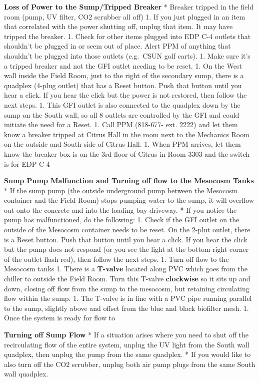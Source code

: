 \documentclass[]{book}
\begin{document}
 \textbf{Loss of Power to the Sump/Tripped Breaker} * Breaker tripped in
the field room (pump, UV filter, CO2 scrubber all off) 1. If you just
plugged in an item that correlated with the power shutting off, unplug
that item. It may have tripped the breaker. 1. Check for other items
plugged into EDP C-4 outlets that shouldn't be plugged in or seem out of
place. Alert PPM of anything that shouldn't be plugged into those
outlets (e.g.~CSUN golf carts). 1. Make sure it's a tripped breaker and
not the GFI outlet needing to be reset. 1. On the West wall inside the
Field Room, just to the right of the secondary sump, there is a quadplex
(4-plug outlet) that has a Reset button. Push that button until you hear
a click. If you hear the click but the power is not restored, then
follow the next steps. 1. This GFI outlet is also connected to the
quadplex down by the sump on the South wall, so all 8 outlets are
controlled by the GFI and could initiate the need for a Reset. 1. Call
PPM (818-677- ext. 2222) and let them know a breaker tripped at Citrus
Hall in the room next to the Mechanics Room on the outside and South
side of Citrus Hall. 1. When PPM arrives, let them know the breaker box
is on the 3rd floor of Citrus in Room 3303 and the switch is for EDP C-4

 \textbf{Sump Pump Malfunction and Turning off flow to the Mesocosm
Tanks} * If the sump pump (the outside underground pump between the
Mesocosm container and the Field Room) stops pumping water to the sump,
it will overflow out onto the concrete and into the loading bay
driveway. * If you notice the pump has malfunctioned, do the following:
1. Check if the GFI outlet on the outside of the Mesocosm container
needs to be reset. On the 2-plut outlet, there is a Reset button. Push
that button until you hear a click. If you hear the click but the pump
does not respond (or you see the light at the bottom right corner of the
outlet flash red), then follow the next steps. 1. Turn off flow to the
Mesocosm tanks 1. There is a \textbf{T-valve} located along PVC which
goes from the chiller to outside the Field Room. Turn this T-valve
\textbf{clockwise} so it sits up and down, closing off flow from the
sump to the mesocosm, but retaining circulating flow within the sump. 1.
The T-valve is in line with a PVC pipe running parallel to the sump,
slightly above and offset from the blue and black biofilter mesh. 1.
Once the system is ready for flow to

 \textbf{Turning off Sump Flow} * If a situation arises where you need
to shut off the recirculating flow of the entire system, unplug the UV
light from the South wall quadplex, then unplug the pump from the same
quadplex. * If you would like to also turn off the CO2 scrubber, unplug
both air pump plugs from the same South wall quadplex.
\end{document}
